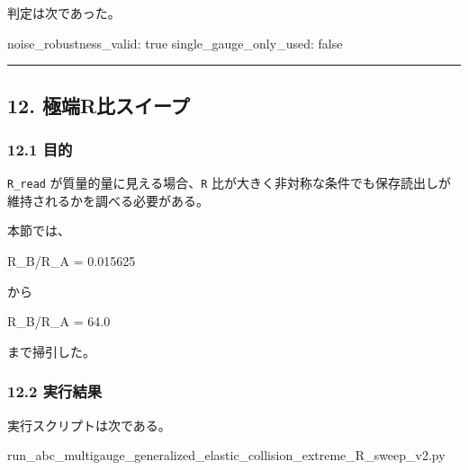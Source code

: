\documentclass[
  a4paper,
]{article}
\newenvironment{Shaded}{}{}
\newcommand{\NormalTok}[1]{#1}
\begin{document}
判定は次であった。

\begin{Shaded}
\begin{Highlighting}[]
\NormalTok{noise\_robustness\_valid: true}
\NormalTok{single\_gauge\_only\_used: false}
\end{Highlighting}
\end{Shaded}

\begin{center}\rule{0.5\linewidth}{0.5pt}\end{center}

\subsection{12.
極端R比スイープ}\label{ux6975ux7aefrux6bd4ux30b9ux30a4ux30fcux30d7}

\subsubsection{12.1 目的}\label{ux76eeux7684-3}

\texttt{R\_read} が質量的量に見える場合、\texttt{R}
比が大きく非対称な条件でも保存読出しが維持されるかを調べる必要がある。

本節では、

\begin{Shaded}
\begin{Highlighting}[]
\NormalTok{R\_B/R\_A = 0.015625}
\end{Highlighting}
\end{Shaded}

から

\begin{Shaded}
\begin{Highlighting}[]
\NormalTok{R\_B/R\_A = 64.0}
\end{Highlighting}
\end{Shaded}

まで掃引した。

\subsubsection{12.2 実行結果}\label{ux5b9fux884cux7d50ux679c-4}

実行スクリプトは次である。

\begin{Shaded}
\begin{Highlighting}[]
\NormalTok{run\_abc\_multigauge\_generalized\_elastic\_collision\_extreme\_R\_sweep\_v2.py}
\end{Highlighting}
\end{Shaded}
\end{document}
